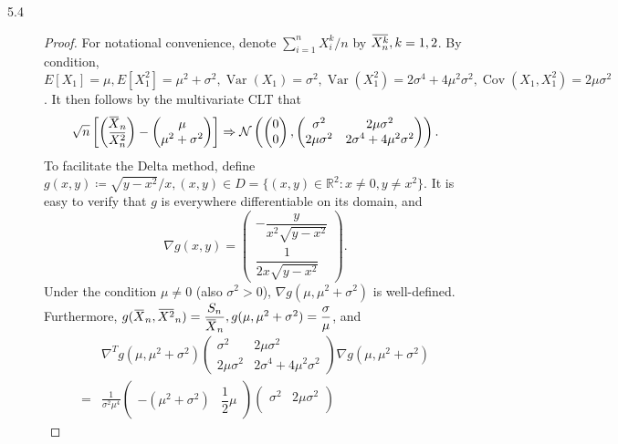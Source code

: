 \documentclass{article}
\newcommand{\real}{\mathbb{R}}
\newcommand{\overbar}[1]{\mkern 1.5mu\overline{\mkern-1.5mu#1\mkern-1.5mu}\mkern 1.5mu}
\newcommand{\gaussian}{\mathcal{N}}
\DeclareMathOperator*{\Var}{Var}
\DeclareMathOperator*{\Cov}{Cov}
\theoremstyle{definition}
\theoremstyle{plain}
\theoremstyle{remark}
\begin{document}
\begin{description}
\item[5.4]
\begin{proof}
For notational convenience, denote $\sum_{i = 1}^n X_i^k/n$ by $\overbar{X_n^k}, k = 1, 2$. By condition, $E[X_1] = \mu, E[X_1^2] = \mu^2 + \sigma^2, \Var(X_1) = \sigma^2, \Var(X_1^2) = 2\sigma^4 + 4\mu^2\sigma^2,
\Cov(X_1, X_1^2) = 2\mu\sigma^2$. It then follows by the multivariate CLT that
\begin{equation*}
\sqrt{n}\left[\begin{pmatrix} \overbar{X}_n \\ \overbar{X_n^2} \end{pmatrix} - \begin{pmatrix} \mu \\ \mu^2 + \sigma^2 \end{pmatrix}\right] \Rightarrow 
\gaussian\left(\begin{pmatrix} 0 \\ 0 \end{pmatrix}, \begin{pmatrix} \sigma^2 & 2\mu\sigma^2 \\
2\mu\sigma^2 & 2\sigma^4 + 4\mu^2\sigma^2 \end{pmatrix}\right).
\end{equation*}
To facilitate the Delta method, define $g(x, y) \coloneqq \sqrt{y - x^2}/x, (x, y) \in D = \{(x, y) \in \real^2: x \neq 0, y \neq x^2\}$. It is easy to verify that $g$ is everywhere differentiable on its domain, and 
\begin{equation*}
\nabla g(x, y) = \begin{pmatrix} -\dfrac{y}{x^2\sqrt{y - x^2}} \\ \dfrac{1}{2x\sqrt{y - x^2}} \end{pmatrix}.
\end{equation*}
Under the condition $\mu \neq 0$ (also $\sigma^2 > 0$), $\nabla g(\mu, \mu^2 + \sigma^2)$ is well-defined. Furthermore, $g(\overbar{X}_n, \overbar{X^2}_n) = \dfrac{S_n}{\overbar{X}_n}, g(\mu, \mu^2 + \sigma^2) = \dfrac{\sigma}{\mu}$, and 
\begin{align*}
& \nabla^T g(\mu, \mu^2 + \sigma^2)  \begin{pmatrix} \sigma^2 & 2\mu\sigma^2 \\
2\mu\sigma^2 & 2\sigma^4 + 4\mu^2\sigma^2 \end{pmatrix} \nabla g(\mu, \mu^2 + \sigma^2) \\
= & \frac{1}{\sigma^2\mu^4} \begin{pmatrix}-(\mu^2 + \sigma^2) & \dfrac{1}{2}\mu \end{pmatrix} \begin{pmatrix} \sigma^2 & 2\mu\sigma^2 \\

\end{pmatrix}
\end{align*}
\end{proof}
\end{description}
\end{document}
